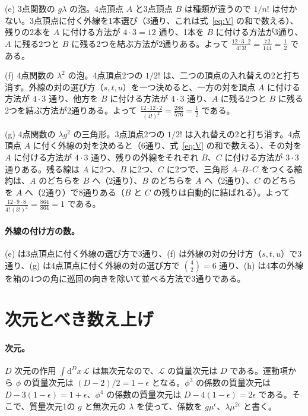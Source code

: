 \documentclass[a4paper,10pt]{ltjsarticle}
\newcommand{\dd}{\mathrm{d}}
\begin{document}
(e) 3点関数の $g\lambda$ の泡。4点頂点 $A$ と3点頂点 $B$ は種類が違うので $1/n!$ は付かない。3点頂点に付く外線を1本選び（3通り、これは式~\eqref{eq:V} の和で数える）、残りの2本を $A$ に付ける方法が $4\cdot3=12$ 通り、1本を $B$ に付ける方法が3通り、$A$ に残る2つと $B$ に残る2つを結ぶ方法が2通りある。よって $\frac{12\cdot3\cdot2}{4!\,3!}=\frac{72}{144}=\frac12$ である。

(f) 4点関数の $\lambda^2$ の泡。4点頂点2つの $1/2!$ は、二つの頂点の入れ替えの2と打ち消す。外線の対の選び方（$s,t,u$）を一つ決めると、一方の対を頂点 $A$ に付ける方法が $4\cdot3$ 通り、他方を $B$ に付ける方法が $4\cdot3$ 通り、$A$ に残る2つと $B$ に残る2つを結ぶ方法が2通りある。よって $\frac{12\cdot12\cdot2}{(4!)^2}=\frac{288}{576}=\frac12$ である。

(g) 4点関数の $\lambda g^2$ の三角形。3点頂点2つの $1/2!$ は入れ替えの2と打ち消す。4点頂点 $A$ に付く外線の対を決めると（6通り、式~\eqref{eq:V} の和で数える）、その対を $A$ に付ける方法が $4\cdot3$ 通り、残りの外線をそれぞれ $B$、$C$ に付ける方法が $3\cdot3$ 通りある。残る線は $A$ に2つ、$B$ に2つ、$C$ に2つで、三角形 $A$--$B$--$C$ をつくる縮約は、$A$ のどちらを $B$ へ（2通り）、$B$ のどちらを $A$ へ（2通り）、$C$ のどちらを $A$ へ（2通り）で8通りある（$B$ と $C$ の残りは自動的に結ばれる）。よって $\frac{12\cdot9\cdot8}{4!\,(3!)^2}=\frac{864}{864}=1$ である。

\paragraph{外線の付け方の数。}(e) は3点頂点に付く外線の選び方で3通り、(f) は外線の対の分け方（$s,t,u$）で3通り、(g) は4点頂点に付く外線の対の選び方で $\binom42=6$ 通り、(h) は4本の外線を箱の4つの角に巡回の向きを除いて並べる方法で3通りである。

\section{次元とべき数え上げ}\label{app:counting}

\paragraph{次元。}$D$ 次元の作用 $\int\dd^Dx\,\mathcal{L}$ は無次元なので、$\mathcal{L}$ の質量次元は $D$ である。運動項から $\phi$ の質量次元は $(D-2)/2=1-\epsilon$ となる。$\phi^3$ の係数の質量次元は $D-3(1-\epsilon)=1+\epsilon$、$\phi^4$ の係数の質量次元は $D-4(1-\epsilon)=2\epsilon$ である。そこで、質量次元1の $g$ と無次元の $\lambda$ を使って、係数を $g\mu^\epsilon$、$\lambda\mu^{2\epsilon}$ と書く。
\end{document}
